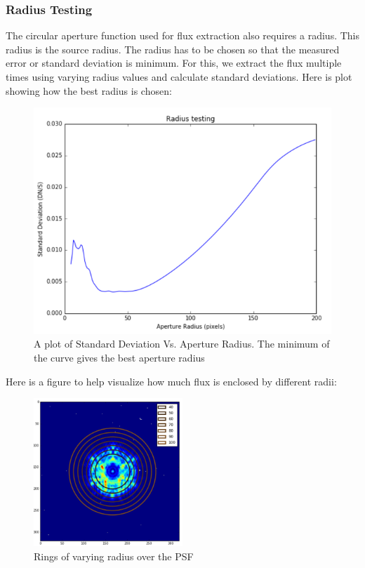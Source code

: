 \documentclass{aastex6}
\begin{document}
        \subsubsection{Radius Testing}
        The circular aperture function used for flux extraction also requires a radius. This radius is the source radius. The radius has to be chosen so that the measured error or standard deviation is minimum. For this, we extract the flux multiple times using varying radius values and calculate standard deviations. Here is plot showing how the best radius is chosen:
        \begin{figure}[H]
            \begin{centering}
            \includegraphics[scale=0.5]{Radius}
            \caption{A plot of Standard Deviation Vs. Aperture Radius. The minimum of the curve gives the best aperture radius}
            \end{centering}
        \end{figure}
        
        Here is a figure to help visualize how much flux is enclosed by different radii:
        
        \begin{figure}[H]
            \begin{centering}
            \includegraphics[width=0.5\textwidth]{varying_r.png}
            \caption{Rings of varying radius over the PSF}
            \end{centering}
        \end{figure}
        
\end{document}
